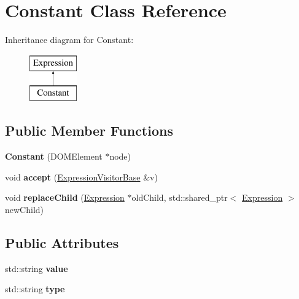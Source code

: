 \hypertarget{class_constant}{\section{Constant Class Reference}
\label{class_constant}
}
Inheritance diagram for Constant\+:\begin{figure}[H]
\begin{center}
\leavevmode
\includegraphics[height=2.000000cm]{class_constant}
\end{center}
\end{figure}
\subsection*{Public Member Functions}
\begin{DoxyCompactItemize}
\item 
\hypertarget{class_constant_a23cf0950dbddde0872f58ad5a501ff3a}{{\bfseries Constant} (D\+O\+M\+Element $\ast$node)}\label{class_constant_a23cf0950dbddde0872f58ad5a501ff3a}

\item 
\hypertarget{class_constant_ae30bbf2455dd5d616291e106749ec1ae}{void {\bfseries accept} (\hyperlink{class_expression_visitor_base}{Expression\+Visitor\+Base} \&v)}\label{class_constant_ae30bbf2455dd5d616291e106749ec1ae}

\item 
\hypertarget{class_constant_acb214c5b00f30970ad525eb6b2f3e04d}{void {\bfseries replace\+Child} (\hyperlink{class_expression}{Expression} $\ast$old\+Child, std\+::shared\+\_\+ptr$<$ \hyperlink{class_expression}{Expression} $>$ new\+Child)}\label{class_constant_acb214c5b00f30970ad525eb6b2f3e04d}

\end{DoxyCompactItemize}
\subsection*{Public Attributes}
\begin{DoxyCompactItemize}
\item 
\hypertarget{class_constant_a97bcf14e26810def51c57ae446d69e06}{std\+::string {\bfseries value}}\label{class_constant_a97bcf14e26810def51c57ae446d69e06}

\item 
\hypertarget{class_constant_aa730d17869971537ca16ffd658b9d4e0}{std\+::string {\bfseries type}}\label{class_constant_aa730d17869971537ca16ffd658b9d4e0}

\end{DoxyCompactItemize}

